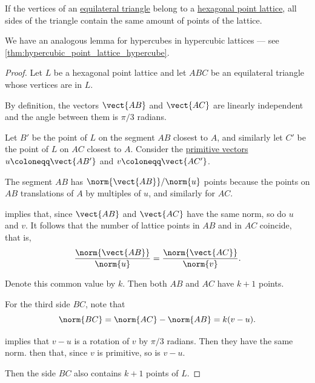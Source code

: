 \begin{lemma}\label{thm:hexagonal_point_lattice_equilateral_triangle}
  If the vertices of an \hyperref[def:triangle/equilateral]{equilateral triangle} belong to a \hyperref[def:hexagonal_point_lattice]{hexagonal point lattice}, all sides of the triangle contain the same amount of points of the lattice.
\end{lemma}
\begin{comments}
  \item We have an analogous lemma for hypercubes in hypercubic lattices --- see \cref{thm:hypercubic_point_lattice_hypercube}.
\end{comments}
\begin{proof}
  Let \( L \) be a hexagonal point lattice and let \( ABC \) be an equilateral triangle whose vertices are in \( L \).

  By definition, the vectors \( \vect{AB} \) and \( \vect{AC} \) are linearly independent and the angle between them is \( \pi / 3 \) radians.

  Let \( B' \) be the point of \( L \) on the segment \( AB \) closest to \( A \), and similarly let \( C' \) be the point of \( L \) on \( AC \) closest to \( A \). Consider the \hyperref[def:primitive_lattice_vector]{primitive vectors} \( u \coloneqq \vect{AB'} \) and \( v \coloneqq \vect{AC'} \).

  The segment \( AB \) has \( \norm{\vect{AB}} / \norm{u} \) points because the points on \( AB \) translations of \( A \) by multiples of \( u \), and similarly for \( AC \).

   implies that, since \( \vect{AB} \) and \( \vect{AC} \) have the same norm, so do \( u \) and \( v \). It follows that the number of lattice points in \( AB \) and in \( AC \) coincide, that is,
  \begin{equation*}
    \frac {\norm{\vect{AB}}} {\norm{u}} = \frac {\norm{\vect{AC}}} {\norm{v}}.
  \end{equation*}

  Denote this common value by \( k \). Then both \( AB \) and \( AC \) have \( k + 1 \) points.

  For the third side \( BC \), note that
  \begin{equation*}
    \norm{BC} = \norm{AC} - \norm{AB} = k(v - u).
  \end{equation*}

   implies that \( v - u \) is a rotation of \( v \) by \( \pi / 3 \) radians. Then they have the same norm.  then that, since \( v \) is primitive, so is \( v - u \).

  Then the side \( BC \) also contains \( k + 1 \) points of \( L \).
\end{proof}

